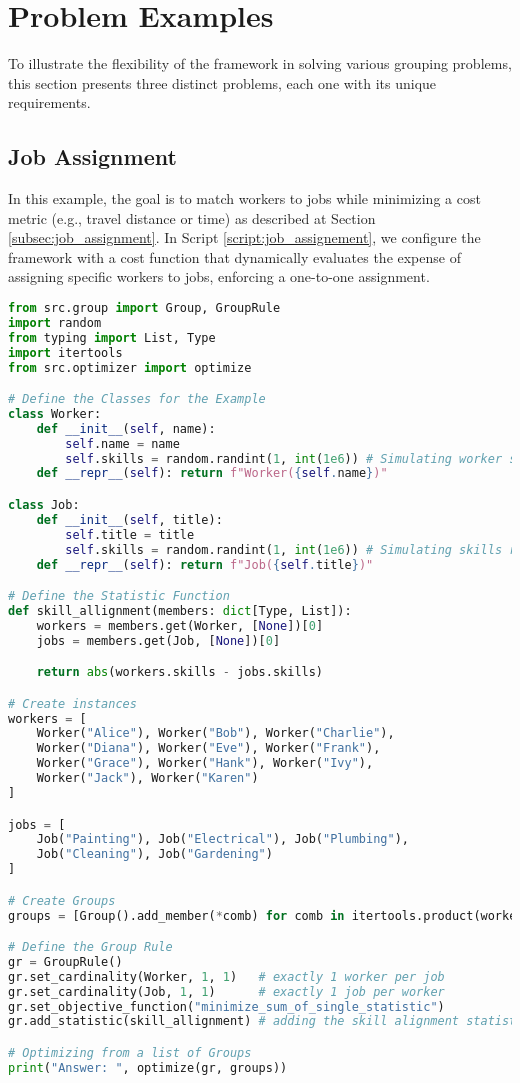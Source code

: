    \section{Problem Examples} \label{sec:examples}
To illustrate the flexibility of the framework in solving various grouping problems, this section presents three distinct problems, each one with its unique requirements.

\subsection{Job Assignment}
In this example, the goal is to match workers to jobs while minimizing a cost metric (e.g., travel distance or time) as described at Section \ref{subsec:job_assignment}. In Script \ref{script:job_assignement}, we configure the framework with a cost function that dynamically evaluates the expense of assigning specific workers to jobs, enforcing a one-to-one assignment.

\begin{lstlisting}[language=Python, caption={Creating and solving the Job Assignment Problem using this framework.}, label={script:job_assignement}]
from src.group import Group, GroupRule
import random
from typing import List, Type
import itertools
from src.optimizer import optimize

# Define the Classes for the Example
class Worker:
    def __init__(self, name):
        self.name = name
        self.skills = random.randint(1, int(1e6)) # Simulating worker skill level
    def __repr__(self): return f"Worker({self.name})"

class Job:
    def __init__(self, title):
        self.title = title
        self.skills = random.randint(1, int(1e6)) # Simulating skills required
    def __repr__(self): return f"Job({self.title})"

# Define the Statistic Function
def skill_allignment(members: dict[Type, List]):
    workers = members.get(Worker, [None])[0]
    jobs = members.get(Job, [None])[0]

    return abs(workers.skills - jobs.skills)

# Create instances
workers = [
    Worker("Alice"), Worker("Bob"), Worker("Charlie"),
    Worker("Diana"), Worker("Eve"), Worker("Frank"),
    Worker("Grace"), Worker("Hank"), Worker("Ivy"),
    Worker("Jack"), Worker("Karen")
]

jobs = [
    Job("Painting"), Job("Electrical"), Job("Plumbing"),
    Job("Cleaning"), Job("Gardening")
]

# Create Groups
groups = [Group().add_member(*comb) for comb in itertools.product(workers, jobs)]

# Define the Group Rule
gr = GroupRule()
gr.set_cardinality(Worker, 1, 1)   # exactly 1 worker per job
gr.set_cardinality(Job, 1, 1)      # exactly 1 job per worker
gr.set_objective_function("minimize_sum_of_single_statistic")
gr.add_statistic(skill_allignment) # adding the skill alignment statistic

# Optimizing from a list of Groups
print("Answer: ", optimize(gr, groups))
\end{lstlisting}


